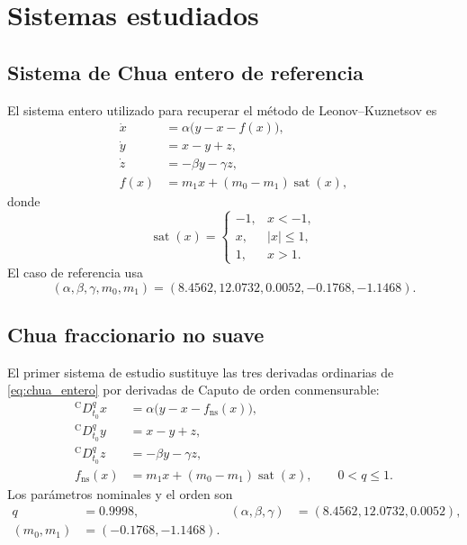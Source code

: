 \ifdefined\HAFOFractionalOnly\else
\section{Sistemas estudiados}
\label{sec:modelos}

\subsection{Sistema de Chua entero de referencia}

El sistema entero utilizado para recuperar el método de
Leonov--Kuznetsov es
\begin{equation}
\begin{aligned}
 \dot x &=\alpha\bigl(y-x-f(x)\bigr),\\
 \dot y &=x-y+z,\\
 \dot z &=-\beta y-\gamma z,\\
 f(x)&=m_1x+(m_0-m_1)\operatorname{sat}(x),
\end{aligned}
\label{eq:chua_entero}
\end{equation}
donde
\begin{equation}
\operatorname{sat}(x)=
\begin{cases}
-1,&x<-1,\\
x,&|x|\leq1,\\
1,&x>1.
\end{cases}
\label{eq:saturacion}
\end{equation}
El caso de referencia usa
\begin{equation}
(\alpha,\beta,\gamma,m_0,m_1)
=(8.4562,12.0732,0.0052,-0.1768,-1.1468).
\label{eq:parametros_enteros}
\end{equation}

\subsection{Chua fraccionario no suave}

El primer sistema de estudio sustituye las tres derivadas ordinarias de
\cref{eq:chua_entero} por derivadas de Caputo de orden conmensurable:
\begin{equation}
\begin{aligned}
 {}^{\mathrm C}D_{t_0}^{q}x
 &=\alpha\bigl(y-x-f_{\mathrm{ns}}(x)\bigr),\\
 {}^{\mathrm C}D_{t_0}^{q}y
 &=x-y+z,\\
 {}^{\mathrm C}D_{t_0}^{q}z
 &=-\beta y-\gamma z,\\
 f_{\mathrm{ns}}(x)
 &=m_1x+(m_0-m_1)\operatorname{sat}(x),
\qquad 0<q\leq1.
\end{aligned}
\label{eq:chua_no_suave}
\end{equation}
Los parámetros nominales y el orden son
\begin{equation}
\begin{aligned}
q&=0.9998, &
(\alpha,\beta,\gamma)&=(8.4562,12.0732,0.0052),\\
(m_0,m_1)&=(-0.1768,-1.1468).
\end{aligned}
\label{eq:parametros_no_suave}
\end{equation}

